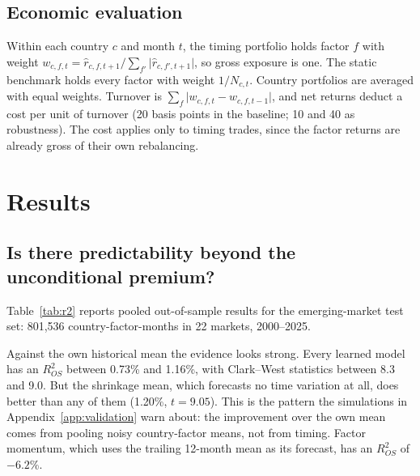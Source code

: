 \documentclass[11pt]{article}
\begin{document}
\subsection{Economic evaluation}
Within each country $c$ and month $t$, the timing portfolio holds factor $f$ with weight $w_{c,f,t} = \hat r_{c,f,t+1} / \sum_{f'} \lvert \hat r_{c,f',t+1} \rvert$, so gross exposure is one. The static benchmark holds every factor with weight $1/N_{c,t}$. Country portfolios are averaged with equal weights. Turnover is $\sum_f \lvert w_{c,f,t} - w_{c,f,t-1} \rvert$, and net returns deduct a cost per unit of turnover (20 basis points in the baseline; 10 and 40 as robustness). The cost applies only to timing trades, since the factor returns are already gross of their own rebalancing.

\section{Results}

\subsection{Is there predictability beyond the unconditional premium?}
Table~\ref{tab:r2} reports pooled out-of-sample results for the emerging-market test set: 801,536 country-factor-months in 22 markets, 2000--2025.

Against the own historical mean the evidence looks strong. Every learned model has an $R^2_{OS}$ between 0.73\% and 1.16\%, with Clark--West statistics between 8.3 and 9.0. But the shrinkage mean, which forecasts no time variation at all, does better than any of them (1.20\%, $t = 9.05$). This is the pattern the simulations in Appendix~\ref{app:validation} warn about: the improvement over the own mean comes from pooling noisy country-factor means, not from timing. Factor momentum, which uses the trailing 12-month mean as its forecast, has an $R^2_{OS}$ of $-6.2$\%.
\end{document}
